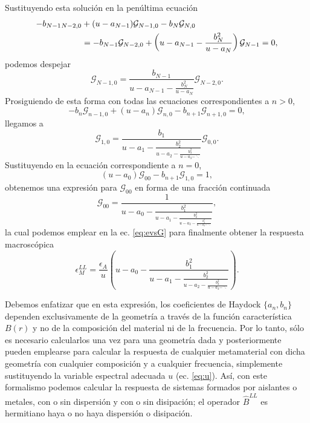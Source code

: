 \documentclass[12pt]{article}
\begin{document}
Sustituyendo esta solución en la penúltima ecuación
\begin{equation}
  \label{eq:GN2}
  \begin{split}
    -b_{N-1}\mathcal \mathcal_{N-2,0}
    &+(u-a_{N-1})\mathcal G_{N-1,0}-b_{N}\mathcal
    G_{N,0}\\
    &=-b_{N-1}\mathcal G_{N-2,0}+
    \left(u-a_{N-1}-\frac{b_N^2}{u-a_N}\right)\mathcal G_{N-1}=0,
  \end{split}
\end{equation}
podemos despejar
\begin{equation}
  \label{eq:GN3}
  \mathcal G_{N-1,0}=\frac{b_{N-1}}{u-a_{N-1}-\frac{b_N^2}{u-a_N}}\mathcal G_{N-2,0}.
\end{equation}
Prosiguiendo de esta forma con todas las ecuaciones correspondientes a $n>0$,
\begin{equation}
  \label{eq:Gnne0}
  -b_n\mathcal G_{n-1,0} +(u-a_n)\mathcal G_{n,0}-b_{n+1}\mathcal G_{n+1,0}=0,
\end{equation}
llegamos a
\begin{equation}
  \label{eq:GN4}
  \mathcal
  G_{1,0}=\frac{b_{1}}{u-a_{1}-\frac{b_2^2}{u-a_2-\frac{b_3^2}{u-a_3-\ddots}}}
  \mathcal G_{0,0}.
\end{equation}
Sustituyendo en la ecuación correspondiente a $n=0$,
\begin{equation}
  \label{eq:Gneq0}
  (u-a_0)\mathcal G_{00}-b_{n+1}\mathcal G_{1,0}=1,
\end{equation}
obtenemos una expresión para $\mathcal G_{00}$ en forma de una
fracción continuada
\begin{equation}
  \label{eq:G00}
  \mathcal
  G_{00}=\frac{1}{u-a_0-\frac{b_{1}^2}{u-a_{1}-\frac{b_2^2}{u-a_2-\frac{b_3^2}{u-a_3-\ddots}}}},
\end{equation}
la cual podemos emplear en la ec. \eqref{eq:evsG} para finalmente
obtener la respuesta macroscópica
\begin{equation}
  \label{eq:eMLL}
  \epsilon_M^{LL}=\frac{\epsilon_A}{u}\left(
    u-a_0-\frac{b_{1}^2}{u-a_{1}-\frac{b_2^2}{u-a_2-\frac{b_3^2}{u-a_3-\ddots}}}\right).
\end{equation}

Debemos enfatizar que en esta expresión, los coeficientes de Haydock
$\{a_n, b_n\}$ dependen exclusivamente de la geometría a través de la función
característica $B(r)$ y no de la composición del material ni
de la frecuencia. Por lo tanto, sólo es necesario calcularlos una vez
para una geometría dada y posteriormente pueden emplearse
para calcular la respuesta de cualquier metamaterial con dicha
geometría con cualquier composición y a cualquier frecuencia,
simplemente sustituyendo la variable espectral adecuada $u$
(ec. \eqref{eq:u}). Así, con este formalismo podemos calcular la
respuesta de sistemas formados por aislantes o metales, con o sin
dispersión y con o sin disipación; el operador $\hat B^{LL}$ es
hermitiano haya o no haya dispersión o disipación.
\end{document}
